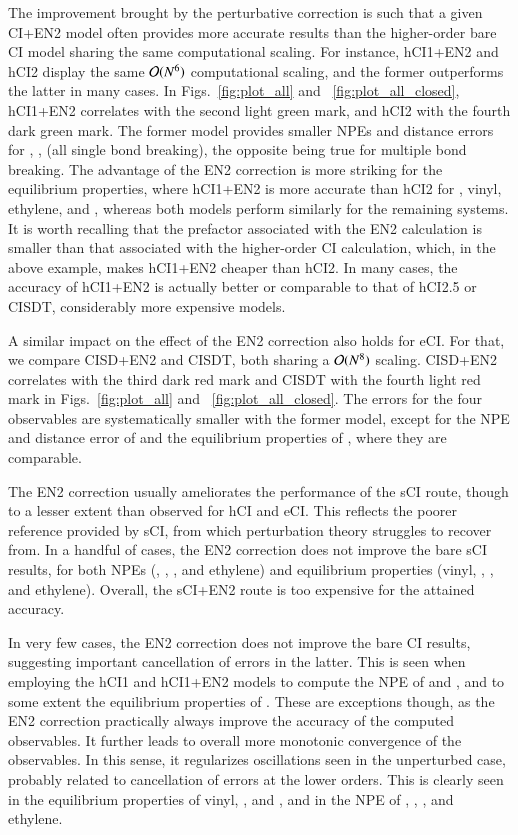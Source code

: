 \documentclass[aip,jcp,reprint,noshowkeys,superscriptaddress]{revtex4-1}
\begin{document}
The improvement brought by the perturbative correction is such that a given CI+EN2 model often provides more accurate results than the higher-order bare CI model sharing the same computational scaling.
For instance, hCI1+EN2 and hCI2 display the same $\order*{N^6}$ computational scaling, and the former outperforms the latter in many cases.
In Figs.~\ref{fig:plot_all} and ~\ref{fig:plot_all_closed}, hCI1+EN2 correlates with the second light green mark, and hCI2 with the fourth dark green mark.
The former model provides smaller NPEs and distance errors for , ,  (all single bond breaking),
the opposite being true for multiple bond breaking.
The advantage of the EN2 correction is more striking for the equilibrium properties,
where hCI1+EN2 is more accurate than hCI2 for , vinyl, ethylene, and ,
whereas both models perform similarly for the remaining systems.
It is worth recalling that the prefactor associated with the EN2 calculation is smaller than that associated with the higher-order CI calculation,
which, in the above example, makes hCI1+EN2 cheaper than hCI2.
In many cases, the accuracy of hCI1+EN2 is actually better or comparable to that of hCI2.5 or CISDT, considerably more expensive models.

A similar impact on the effect of the EN2 correction also holds for eCI.
For that, we compare CISD+EN2 and CISDT, both sharing a $\order*{N^8}$ scaling.
CISD+EN2 correlates with the third dark red mark and CISDT with the fourth light red mark in Figs.~\ref{fig:plot_all} and ~\ref{fig:plot_all_closed}.
The errors for the four observables are systematically smaller with the former model,
except for the NPE and distance error of  and the equilibrium properties of , where they are comparable.

The EN2 correction usually ameliorates the performance of the sCI route, though to a lesser extent than observed for hCI and eCI.
This reflects the poorer reference provided by sCI, from which perturbation theory struggles to recover from.
In a handful of cases, the EN2 correction does not improve the bare sCI results,
for both NPEs (, , , and ethylene)
and equilibrium properties (vinyl, , , and ethylene).
Overall, the sCI+EN2 route is too expensive for the attained accuracy.

In very few cases, the EN2 correction does not improve the bare CI results, suggesting important cancellation of errors in the latter.
This is seen when employing the hCI1 and hCI1+EN2 models to compute the NPE of  and , and to some extent the equilibrium properties of .
These are exceptions though, as the EN2 correction practically always improve the accuracy of the computed observables.
It further leads to overall more monotonic convergence of the observables.
In this sense, it regularizes oscillations seen in the unperturbed case, probably related to cancellation of errors at the lower orders.
This is clearly seen in the equilibrium properties of vinyl, , and ,
and in the NPE of , , , and ethylene.
\end{document}
